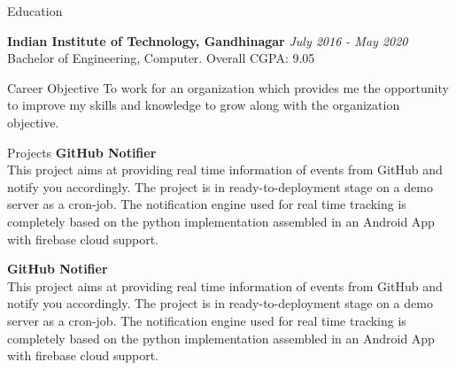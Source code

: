 \documentclass{resume}
\begin{document}
\begin{rSection}{Education}


{\bf Indian Institute of Technology, Gandhinagar} \hfill {\em July 2016 - May 2020} 
\\ Bachelor of Engineering, Computer.\hfill { Overall CGPA: 9.05 }

\end{rSection}

\begin{rSection}{Career Objective}
 To work for an organization which provides me the opportunity to improve my skills and knowledge to grow along with the organization objective.
\end{rSection}

\begin{rSection}{Projects}
{\bf GitHub Notifier}
\\This project aims at providing real time information of events from GitHub and notify you accordingly. The project is in ready-to-deployment stage on a demo server as a cron-job. The notification engine  used for real time tracking is completely based on the python implementation assembled in an Android App with firebase cloud support.

{\bf GitHub Notifier}
\\This project aims at providing real time information of events from GitHub and notify you accordingly. The project is in ready-to-deployment stage on a demo server as a cron-job. The notification engine  used for real time tracking is completely based on the python implementation assembled in an Android App with firebase cloud support.

\end{rSection}
\end{document}
